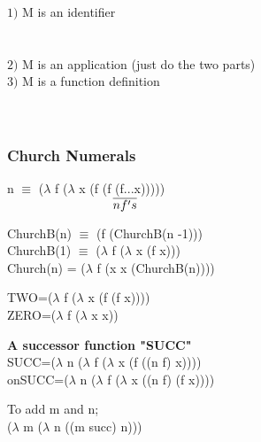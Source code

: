 \documentclass{article}
\newcommand\tab[1][1cm]{\hspace*{#1}}
\begin{document}
\begin{flushleft}
$1)$ M is an identifier\\
\tab{a) M=x $\Rightarrow$ M[x	:=N] is N}\\
\tab{b) M$\neq$x $\Rightarrow$ M[x:=N] is M}\\
\bigskip
$2)$ M is an application (just do the two parts)\\
\bigskip
$3)$ M is a function definition\\
\tab{Case (a) is easy $\lambda$yM1, y=x}\\
\tab{Case (b) is hard $\lambda$yM1, y$\neq$x}\\
\end{flushleft}

\subsubsection*{Church Numerals}
\begin{flushleft}
n $\equiv$ ($\lambda$ f ($\lambda$ x (f (f (f...x)))))\\
$\tab{\tab{\tab{\overline{n f's}}}}$
\end{flushleft}

\begin{flushleft}
ChurchB(n) $\equiv$ (f (ChurchB(n -1)))\\
ChurchB(1) $\equiv$ ($\lambda$ f ($\lambda$ x (f x)))\\
\bigskip
Church(n) = ($\lambda$ f (x x (ChurchB(n))))\\
\end{flushleft}

\begin{flushleft}
TWO=($\lambda$ f ($\lambda$ x (f (f x))))\\
ZERO=($\lambda$ f ($\lambda$ x x))\\
\end{flushleft}
\bigskip
\begin{flushleft}
\textbf{A successor function "SUCC"}\\
SUCC=($\lambda$ n ($\lambda$ f ($\lambda$ x (f ((n f) x))))\\
onSUCC=($\lambda$ n ($\lambda$ f ($\lambda$ x ((n f) (f x))))
\end{flushleft}

\begin{flushleft}
To add m and n;\\
($\lambda$ m ($\lambda$ n ((m succ) n)))
\end{flushleft}
\end{document}
